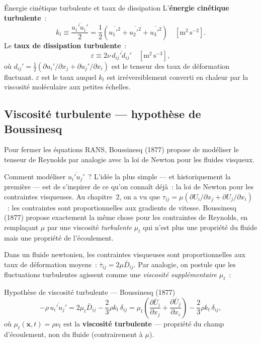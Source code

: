 \documentclass[11pt,a4paper]{report}
\begin{document}
\begin{defbox}{\'Energie cin\'etique turbulente et taux de dissipation}
L'\textbf{\'energie cin\'etique turbulente}~:
\[
  k_t \equiv \frac{\overline{u_i'u_i'}}{2}
  = \frac{1}{2}\!\left(\overline{u_1'^2}+\overline{u_2'^2}+\overline{u_3'^2}\right)
  \quad [\mathrm{m^2\,s^{-2}}].
\]
Le \textbf{taux de dissipation turbulente}~:
\[
  \varepsilon \equiv 2\nu\,\overline{d_{ij}'d_{ij}'}
  \quad [\mathrm{m^2\,s^{-3}}],
\]
o\`u $d_{ij}' = \tfrac{1}{2}(\partial u_i'/\partial x_j + \partial u_j'/\partial x_i)$
est le tenseur des taux de d\'eformation fluctuant.
$\varepsilon$ est le taux auquel $k_t$ est irr\'eversiblement converti en chaleur par la
viscosit\'e mol\'eculaire aux petites \'echelles.
\end{defbox}

\subsection{Viscosit\'e turbulente --- hypoth\`ese de Boussinesq}

Pour fermer les \'equations RANS, Boussinesq (1877) propose de mod\'eliser le tenseur de
Reynolds par analogie avec la loi de Newton pour les fluides visqueux.

Comment mod\'eliser $\overline{u_i'u_j'}$~? L'id\'ee la plus simple --- et historiquement la
premi\`ere --- est de s'inspirer de ce qu'on conna\^it d\'ej\`a~: la loi de Newton pour les
contraintes visqueuses. Au chapitre~2, on a vu que
$\tau_{ij} = \mu(\partial U_i/\partial x_j + \partial U_j/\partial x_i)$~: les contraintes
sont proportionnelles aux gradients de vitesse. Boussinesq (1877) propose exactement la m\^eme
chose pour les contraintes de Reynolds, en rempla\c cant $\mu$ par une viscosit\'e
\emph{turbulente} $\mu_t$ qui n'est plus une propri\'et\'e du fluide mais une propri\'et\'e de
l'\'ecoulement.

Dans un fluide
newtonien, les contraintes visqueuses sont proportionnelles aux taux de d\'eformation
moyens~: $\bar{\tau}_{ij} = 2\mu\bar{D}_{ij}$. Par analogie, on postule que les
fluctuations turbulentes agissent comme une \emph{viscosit\'e suppl\'ementaire} $\mu_t$~:

\begin{importantbox}{Hypoth\`ese de viscosit\'e turbulente --- Boussinesq (1877)}
\[
  -\rho\,\overline{u_i'u_j'} = 2\mu_t\bar{D}_{ij} - \frac{2}{3}\rho k_t\,\delta_{ij}
  = \mu_t\!\left(\frac{\partial\bar{U}_i}{\partial x_j}
  + \frac{\partial\bar{U}_j}{\partial x_i}\right) - \frac{2}{3}\rho k_t\,\delta_{ij},
\]
o\`u $\mu_t(\bm{x},t) = \rho\nu_t$ est la \textbf{viscosit\'e turbulente} ---
propri\'et\'e du champ d'\'ecoulement, non du fluide (contrairement \`a $\mu$).
\end{importantbox}
\end{document}
